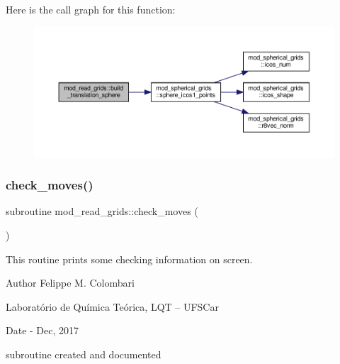 Here is the call graph for this function\+:
\nopagebreak
\begin{figure}[H]
\begin{center}
\leavevmode
\includegraphics[width=350pt]{namespacemod__read__grids_a4285bde2d44b92f9fcc792dfeebb1eae_cgraph}
\end{center}
\end{figure}
\mbox{\label{namespacemod__read__grids_a318177c120a409fe4cef7d1785b626ac}} 
\subsubsection{\texorpdfstring{check\+\_\+moves()}{check\_moves()}}
{\footnotesize\ttfamily subroutine mod\+\_\+read\+\_\+grids\+::check\+\_\+moves (\begin{DoxyParamCaption}{ }\end{DoxyParamCaption})}



This routine prints some checking information on screen. 

\begin{DoxyAuthor}{Author}
Felippe M. Colombari
\begin{DoxyItemize}
\item Laboratório de Química Teórica, L\+QT -- U\+F\+S\+Car 
\end{DoxyItemize}
\end{DoxyAuthor}
\begin{DoxyDate}{Date}
-\/ Dec, 2017
\begin{DoxyItemize}
\item subroutine created and documented 
\end{DoxyItemize}
\end{DoxyDate}


